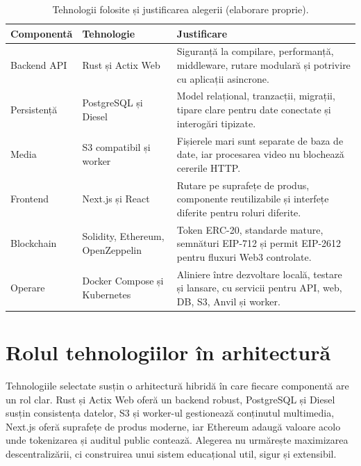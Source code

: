 \begin{table}[H]
    \centering
    \caption{Tehnologii folosite și justificarea alegerii (elaborare proprie).}
    \label{tab:tehnologii}
    \begin{tabular}{P{3cm}P{4.2cm}P{6.6cm}}
        \toprule
        Componentă & Tehnologie & Justificare \\
        \midrule
        Backend API & Rust și Actix Web & Siguranță la compilare, performanță, middleware, rutare modulară și potrivire cu aplicații asincrone. \\
        Persistență & PostgreSQL și Diesel & Model relațional, tranzacții, migrații, tipare clare pentru date conectate și interogări tipizate. \\
        Media & S3 compatibil și worker & Fișierele mari sunt separate de baza de date, iar procesarea video nu blochează cererile HTTP. \\
        Frontend & Next.js și React & Rutare pe suprafețe de produs, componente reutilizabile și interfețe diferite pentru roluri diferite. \\
        Blockchain & Solidity, Ethereum, OpenZeppelin & Token ERC-20, standarde mature, semnături EIP-712 și permit EIP-2612 pentru fluxuri Web3 controlate. \\
        Operare & Docker Compose și Kubernetes & Aliniere între dezvoltare locală, testare și lansare, cu servicii pentru API, web, DB, S3, Anvil și worker. \\
        \bottomrule
    \end{tabular}
\end{table}

\section{Rolul tehnologiilor în arhitectură}
Tehnologiile selectate susțin o arhitectură hibridă în care fiecare componentă are un rol clar. Rust și Actix Web oferă un backend robust, PostgreSQL și Diesel susțin consistența datelor, S3 și worker-ul gestionează conținutul multimedia, Next.js oferă suprafețe de produs moderne, iar Ethereum adaugă valoare acolo unde tokenizarea și auditul public contează. Alegerea nu urmărește maximizarea descentralizării, ci construirea unui sistem educațional util, sigur și extensibil.
